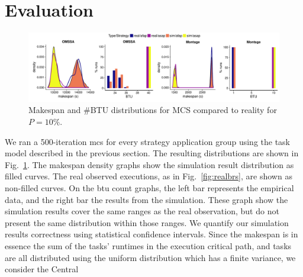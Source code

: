 \documentclass[]{llncs}
\begin{document}
\section{Evaluation}
\label{sec:eval}
\begin{figure}[bt]
	\includegraphics[width=\textwidth]{gfx/fit_plot.pdf}
	\caption[caption]{Makespan and \#BTU distributions for MCS compared to
		reality for $P=10\%$.%
	}
	\label{fig:fit}
\end{figure}
We ran a 500-iteration \ac{mcs} for every strategy application group using
the task model described in  the previous section. The  resulting distributions
are  shown  in  Fig.~\ref{fig:fit}.   The makespan  density  graphs  show  the
simulation  result  distribution   as  filled  curves. The  real  observed
executions, as in  Fig.~\ref{fig:realbrs}, are shown as  non-filled curves. On 
the \ac{btu} count graphs, the  left bar represents
the empirical data, and the right  bar the results from the simulation.
%
These graph show the simulation results cover the same ranges as the real
observation, but do not present the same distribution within those ranges. 
%
%
We quantify our simulation results correctness using statistical confidence
intervals.   Since the makespan is in essence  the sum of the tasks' runtimes
in the  execution critical path,  and tasks  are all distributed  using the
uniform distribution  which  has a  finite variance,  we consider the Central
\end{document}
